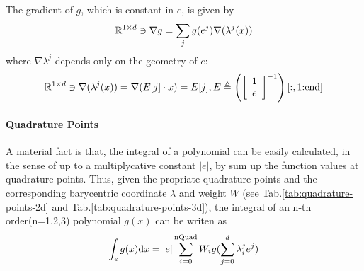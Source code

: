 The gradient of $g$, which is constant in $e$, is given by
\[\mathbb{R}^{1\times d}\owns\nabla g=\sum_{j}g(e^j)\nabla(\lambda^j(x))
\]
where $\nabla \lambda^j$ depends only on the geometry of $e$:
\begin{equation}\label{eq:nabla-barycentric-coordinate}
  \mathbb{R}^{1\times d}\owns\nabla(\lambda^j(x))=\nabla(E[j]\cdot x)=E[j],
  E\triangleq\left(\left[\begin{array}{c} 1 \\ e \end{array}\right]^{-1}\right)[:,1\text{:end}]
\end{equation}

\paragraph{Quadrature Points}
A material fact is that, the integral of a polynomial can be easily calculated, 
in the sense of up to a multiplycative constant $|e|$,
by sum up the function values at quadrature points\cite{chen2008ifem}.
Thus, given the propriate quadrature points and the corresponding 
barycentric coordinate $\lambda$ and weight $W$
(see Tab.\ref{tab:quadrature-points-2d} and Tab.\ref{tab:quadrature-points-3d}),
the integral of an n-th order(n=1,2,3) polynomial $g(x)$ can be writen as 
\begin{equation}\label{eq:quadrature-points-integral}
  \int_e g(x)\mathrm{d} x=|e|\sum_{i=0}^{\text{nQuad}}W_ig(\sum_{j=0}^{d}\lambda_i^je^j)
\end{equation}
